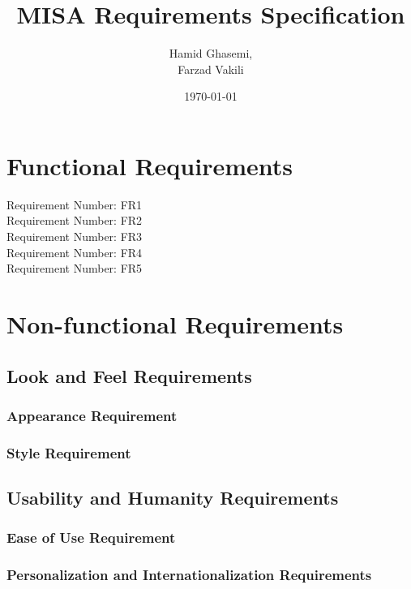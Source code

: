 \documentclass[12pt, titlepage]{article}
\title{MISA Requirements Specification }
\author{Hamid Ghasemi,\\
		Farzad Vakili
}
\date{\today}
\begin{document}
\maketitle
\newpage
{}



\section{Functional Requirements}

Requirement Number: FR1\\


Requirement Number: FR2\\


Requirement Number: FR3\\


Requirement Number: FR4\\


Requirement Number: FR5\\



\section{Non-functional Requirements}

\subsection{Look and Feel Requirements}
\subsubsection{Appearance Requirement}


\subsubsection{Style Requirement}



\subsection{Usability and Humanity Requirements}
\subsubsection{Ease of Use Requirement}
 

\subsubsection{Personalization and Internationalization Requirements}
\end{document}
